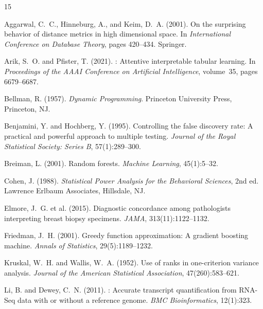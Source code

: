 \documentclass{article}
\begin{document}

\begin{thebibliography}{15}

Aggarwal, C.~C., Hinneburg, A., and Keim, D.~A. (2001).
\newblock On the surprising behavior of distance metrics in high dimensional space.
\newblock In \emph{International Conference on Database Theory}, pages 420--434. Springer.

Arik, S.~O. and Pfister, T. (2021).
: Attentive interpretable tabular learning.
\newblock In \emph{Proceedings of the AAAI Conference on Artificial Intelligence}, volume~35, pages 6679--6687.

Bellman, R. (1957).
\newblock \emph{Dynamic Programming}.
\newblock Princeton University Press, Princeton, NJ.

Benjamini, Y. and Hochberg, Y. (1995).
\newblock Controlling the false discovery rate: A practical and powerful approach to multiple testing.
\newblock \emph{Journal of the Royal Statistical Society: Series B}, 57(1):289--300.

Breiman, L. (2001).
\newblock Random forests.
\newblock \emph{Machine Learning}, 45(1):5--32.

Cohen, J. (1988).
\newblock \emph{Statistical Power Analysis for the Behavioral Sciences}, 2nd ed.
\newblock Lawrence Erlbaum Associates, Hillsdale, NJ.

Elmore, J.~G. et al. (2015).
\newblock Diagnostic concordance among pathologists interpreting breast biopsy specimens.
\newblock \emph{JAMA}, 313(11):1122--1132.

Friedman, J.~H. (2001).
\newblock Greedy function approximation: A gradient boosting machine.
\newblock \emph{Annals of Statistics}, 29(5):1189--1232.

Kruskal, W.~H. and Wallis, W.~A. (1952).
\newblock Use of ranks in one-criterion variance analysis.
\newblock \emph{Journal of the American Statistical Association}, 47(260):583--621.

Li, B. and Dewey, C.~N. (2011).
: Accurate transcript quantification from {RNA-Seq} data with or without a reference genome.
\newblock \emph{BMC Bioinformatics}, 12(1):323.


\end{thebibliography}
\end{document}
